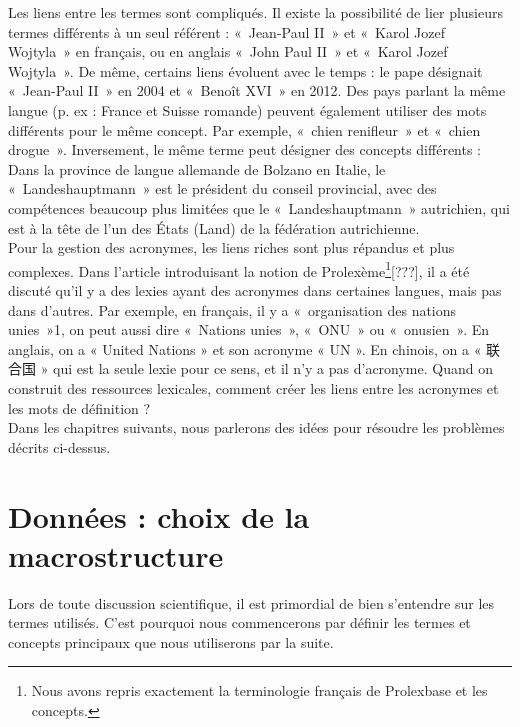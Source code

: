 \documentclass[10pt,a4paper,twoside]{article}
\newcommand{\Chinois}[1]{{\fontspec[Scale=0.9]{STSong}#1}}
\begin{document}
Les liens entre les termes sont compliqués. Il existe la possibilité de lier plusieurs termes différents à un seul référent : « Jean-Paul II » et « Karol Jozef Wojtyla » en français, ou en anglais « John Paul II » et « Karol Jozef Wojtyla ». De même, certains liens évoluent avec le temps : le pape désignait « Jean-Paul II » en 2004 et « Benoît XVI » en 2012. Des pays parlant la même langue (p. ex : France et Suisse romande) peuvent également utiliser des mots différents pour le même concept. Par exemple, « chien renifleur » et « chien drogue ». Inversement, le même terme peut désigner des concepts différents : Dans la province de langue allemande de Bolzano en Italie, le « Landeshauptmann » est le président du conseil provincial, avec des compétences beaucoup plus limitées que le « Landeshauptmann » autrichien, qui est à la tête de l'un des États (Land) de la fédération autrichienne. \\
Pour la gestion des acronymes, les liens riches sont plus répandus et plus complexes. Dans l'article introduisant la notion de Prolexème\footnote{Nous avons repris exactement la terminologie français de Prolexbase et les concepts.}[???], il a été discuté qu'il y a des lexies ayant des acronymes dans certaines langues, mais pas dans d'autres. Par exemple, en français, il y a « organisation des nations unies »1, on peut aussi dire « Nations unies », « ONU » ou « onusien ». En anglais, on a « United Nations » et son acronyme « UN ». En chinois, on a « \Chinois{联合国} » qui est la seule lexie pour ce sens, et il n'y a pas d'acronyme. Quand on construit des ressources lexicales, comment créer les liens entre les acronymes et les mots de définition ? \\
Dans les chapitres suivants, nous parlerons des idées pour résoudre les problèmes décrits ci-dessus. 

\section{Données : choix de la macrostructure}
Lors de toute discussion scientifique, il est primordial de bien s'entendre sur les termes utilisés. C'est pourquoi nous commencerons par définir les termes et concepts principaux que nous utiliserons par la suite. \\
\end{document}
